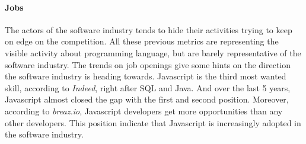 


\paragraph{Jobs}

The actors of the software industry tends to hide their activities trying to keep on edge on the competition.
All these previous metrics are representing the visible activity about programming language, but are barely representative of the software industry.
The trends on job openings give some hints on the direction the software industry is heading towards.
Javascript is the third most wanted skill, according to \textit{Indeed}, right after SQL and Java.
And over the last 5 years, Javascript almost closed the gap with the first and second position.
Moreover, according to \textit{breaz.io}, Javascript developers get more opportunities than any other developers.
This position indicate that Javascript is increasingly adopted in the software industry.

